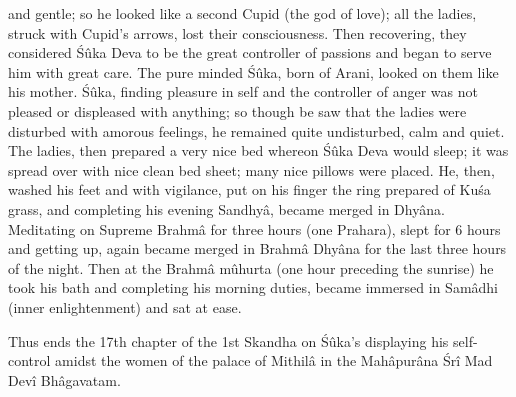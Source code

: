 and gentle; so he looked like a second Cupid (the god of love); all the ladies, struck with Cupid’s arrows, lost their consciousness. Then recovering, they considered \'S\^uka Deva to be the great controller of passions and began to serve him with great care. The pure minded \'S\^uka, born of Arani, looked on them like his mother. \'S\^uka, finding pleasure in self and the controller of anger was not pleased or displeased with anything; so though be saw that the ladies were disturbed with amorous feelings, he remained quite undisturbed, calm and quiet. The ladies, then prepared a very nice bed whereon \'S\^uka Deva would sleep; it was spread over with nice clean bed sheet; many nice pillows were placed. He, then, washed his feet and with vigilance, put on his finger the ring prepared of Ku\'sa grass, and completing his evening Sandhy\^a, became merged in Dhy\^ana. Meditating on Supreme Brahm\^a for three hours (one Prahara), slept for 6 hours and getting up, again became merged in Brahm\^a Dhy\^ana for the last three hours of the night. Then at the Brahm\^a m\^uhurta (one hour preceding the sunrise) he took his bath and completing his morning duties, became immersed in Sam\^adhi (inner enlightenment) and sat at ease.

Thus ends the 17th chapter of the 1st Skandha on \'S\^uka's displaying his self-control amidst the women of the palace of Mithil\^a in the Mah\^apur\^ana \'Sr\^i Mad Dev\^i Bh\^agavatam.